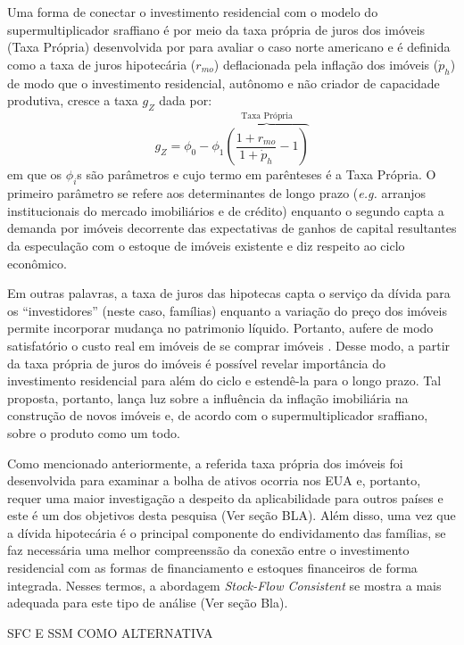 Uma forma de conectar o investimento residencial com o modelo do supermultiplicador sraffiano é por meio da taxa própria de juros dos imóveis (Taxa Própria) desenvolvida por \textcite{teixeira_crescimento_2015} para avaliar o caso norte americano e é definida como a taxa de juros hipotecária ($r_{mo}$) deflacionada pela inflação dos imóveis ({$\dot p_h$}) de modo que o investimento residencial, autônomo e não criador de capacidade produtiva, cresce a taxa $g_Z$ dada por:
\begin{equation}
g_Z = \phi_0 - \phi_1 \overbrace{\left(\frac{1+r_{mo}}{1+\dot p_h} - 1\right)}^{\text{Taxa Própria}}
\end{equation}
em que os $\phi_i$s são parâmetros e cujo termo em parênteses é a Taxa Própria. O primeiro parâmetro se refere aos determinantes de longo prazo (\textit{e.g.} arranjos institucionais do mercado imobiliários e de crédito) enquanto o segundo capta a demanda por imóveis decorrente das expectativas de ganhos de capital resultantes da especulação com o estoque de imóveis existente e diz respeito ao ciclo econômico.

Em outras palavras, a taxa de juros das hipotecas capta o serviço da dívida para os ``investidores'' (neste caso, famílias) enquanto a variação do preço dos imóveis permite incorporar mudança no patrimonio líquido. Portanto, aufere de modo satisfatório o custo real em imóveis de se comprar imóveis \cite[p.~53]{teixeira_crescimento_2015}. Desse modo, a partir da taxa própria de juros do imóveis é possível revelar importância do investimento residencial para além do ciclo e estendê-la para o longo prazo.  Tal proposta, portanto, lança luz sobre a influência da inflação imobiliária na construção de novos imóveis e, de acordo com o supermultiplicador sraffiano, sobre o produto como um todo. 

Como mencionado anteriormente, a referida taxa própria dos imóveis foi desenvolvida para examinar a bolha de ativos ocorria nos EUA e, portanto, requer uma maior investigação a despeito da aplicabilidade para outros países e este é um dos objetivos desta pesquisa (Ver seção BLA). Além disso, uma vez que a dívida hipotecária é o principal componente do endividamento das famílias, se faz necessária uma melhor compreenssão da conexão entre o investimento residencial com as formas de financiamento e estoques financeiros de forma integrada. Nesses termos, a abordagem \textit{Stock-Flow Consistent} se mostra a mais adequada para este tipo de análise (Ver seção Bla).

SFC E SSM COMO ALTERNATIVA

